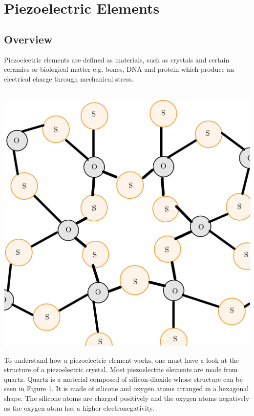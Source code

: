 \chapter{Piezoelectric Elements}

\section{Overview}

Piezoelectric elements are defined as materials, such as crystals and certain ceramics or biological matter e.g. bones, DNA and protein which produce an electrical charge through mechanical stress. \\
\\
\begin{minipage}{0.33\textwidth}
    \includegraphics[width=\textwidth]{./Figure_1.jpg}
    \label{fig:Structue of Quartz}
\end{minipage}
\begin{minipage}{0.66\textwidth}
    To understand how a piezoelectric element works, one must have a look at the structure of a piezoelectric crystal. Most piezoelectric elements are made from quartz. Quartz is a material composed of silicon-dioxide whose structure can be seen in Figure 1. It is made of silicone and oxygen atoms arranged in a hexagonal shape. The silicone atoms are charged positively and the oxygen atoms negatively as the oxygen atom has a higher electronegativity.\\
\end{minipage}
